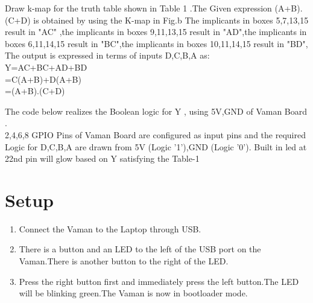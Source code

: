 \documentclass[10pt, a4paper]{article}
\begin{document}
Draw k-map for  the truth table shown in Table 1 .The Given expression  (A+B).(C+D) is obtained by  using the K-map in Fig.b 
The implicants in boxes 5,7,13,15 result in "AC" ,the implicants in boxes 9,11,13,15 result in "AD",the implicants in boxes 6,11,14,15 result in "BC",the implicants in boxes 10,11,14,15 result in "BD",
\\The output is expressed in terms of inputs D,C,B,A as: 
\\Y=AC+BC+AD+BD
\\ =C(A+B)+D(A+B)
\\ =(A+B).(C+D)


The code below realizes the Boolean logic for Y , using 5V,GND of Vaman Board .
\\
2,4,6,8 GPIO Pins of Vaman Board are configured as input pins and the required Logic for D,C,B,A are drawn from 5V (Logic '1'),GND (Logic '0'). Built in led at 22nd pin will glow based on Y satisfying the Table-1
\begin{center}
\end{center}
\section{Setup}
\begin{enumerate}
\item Connect the Vaman to the Laptop through USB.
\item There is a button and an LED to the left of the USB port on the Vaman.There is another button to the right of the LED.
\item Press the right button first and immediately press the left button.The LED will be blinking green.The Vaman is now in bootloader mode.
\end{enumerate}
\end{document}
